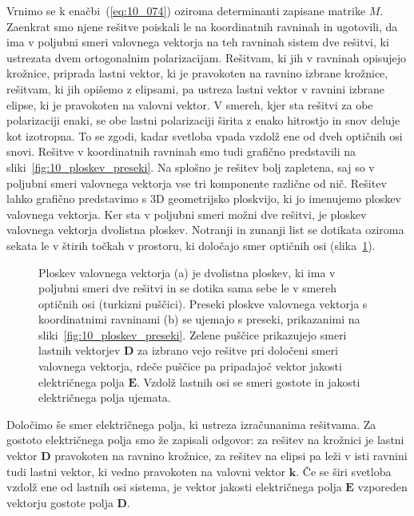 Vrnimo se k enačbi~(\ref{eq:10_074}) oziroma determinanti zapisane matrike $M$. Zaenkrat smo njene 
rešitve poiskali le na koordinatnih ravninah in ugotovili, da ima v poljubni smeri valovnega vektorja
na teh ravninah sistem dve rešitvi, ki ustrezata dvem ortogonalnim polarizacijam. Rešitvam, ki jih
v ravninah opisujejo krožnice, priprada lastni vektor, ki je pravokoten na ravnino izbrane krožnice, 
rešitvam, ki jih opišemo z elipsami, pa ustreza lastni vektor v ravnini izbrane elipse, ki je pravokoten
na valovni vektor. V smereh, kjer
sta rešitvi za obe polarizaciji enaki, se obe lastni polarizaciji širita z enako hitrostjo in snov 
deluje kot izotropna. To se zgodi, kadar svetloba vpada vzdolž ene od dveh optičnih osi snovi.
Rešitve v koordinatnih ravninah smo tudi grafično predstavili na sliki~\ref{fig:10_ploskev_preseki}.
Na splošno je rešitev bolj zapletena, saj so v poljubni smeri valovnega vektorja vse tri komponente 
različne od nič. Rešitev lahko grafično predstavimo s 3D geometrijsko ploskvijo, ki jo imenujemo
ploskev valovnega vektorja. Ker sta v poljubni smeri možni dve rešitvi, je ploskev valovnega vektorja
dvolistna ploskev. Notranji in zunanji list se dotikata oziroma sekata le v štirih točkah v prostoru, ki
določajo smer optičnih osi (slika~\ref{fig:10_ploskev_3D}).

\begin{figure}[h]
\centering
\def\svgwidth{140truemm} 

\caption{Ploskev valovnega vektorja (a) je dvolistna ploskev, ki ima v poljubni smeri dve rešitvi in 
se dotika sama sebe le v smereh optičnih osi (turkizni puščici). Preseki ploskve valovnega vektorja
s koordinatnimi ravninami (b) se ujemajo s preseki, prikazanimi na sliki~\ref{fig:10_ploskev_preseki}.
Zelene puščice prikazujejo smeri lastnih vektorjev $\mathbf{D}$ za izbrano vejo rešitve pri 
določeni smeri valovnega vektorja, rdeče puščice pa pripadajoč vektor jakosti električnega polja 
$\mathbf{E}$. Vzdolž lastnih osi se smeri gostote in jakosti električnega polja ujemata.}
\label{fig:10_ploskev_3D}
\end{figure}
 
Določimo še smer električnega polja, ki ustreza izračunanima rešitvama. Za gostoto električnega polja
smo že zapisali odgovor: za rešitev na krožnici je lastni vektor $\mathbf{D}$ pravokoten
na ravnino krožnice, za rešitev na elipsi pa leži v isti ravnini tudi lastni vektor, ki 
vedno pravokoten na valovni vektor $\mathbf{k}$. Če se širi svetloba vzdolž ene od lastnih osi
sistema, je vektor jakosti električnega polja $\mathbf{E}$ vzporeden vektorju gostote polja $\mathbf{D}$.

